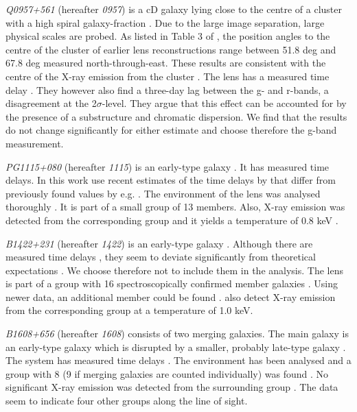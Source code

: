 \documentclass[useAMS,usenatbib]{mn2e}
\begin{document}
\textit{Q0957+561} (hereafter \textit{0957}) is a cD galaxy lying close to the centre of a cluster with a high spiral galaxy-fraction \citep[e.g.][]{1992MNRAS.254P..27G,1994A&A...291..411A,1998ApJ...504..661C}. Due to the large image separation, large physical scales are probed. As listed in Table 3 of \cite{2000ApJ...542...74K}, the position angles to the centre of the cluster of earlier lens reconstructions range between 51.8 deg and 67.8 deg measured north-through-east. These results are consistent with the centre of the X-ray emission from the cluster \citep{1998ApJ...504..661C}. The lens has a measured time delay \citep[e.g.][]{2012A&A...540A.132S}. They however also find a three-day lag between the g- and r-bands, a disagreement at the 2$\sigma$-level. They argue that this effect can be accounted for by the presence of a substructure and chromatic dispersion. We find that the results do not change significantly for either estimate and choose therefore the g-band measurement.

\textit{PG1115+080} (hereafter \textit{1115}) is an early-type galaxy \citep{2005ApJ...626...51Y}. It has measured time delays. In this work use recent estimates of the time delays by \cite{2010MNRAS.406.2764T} that differ from previously found values by e.g. \cite{1997ApJ...489...21B}. The environment of the lens was analysed thoroughly \citep{2006ApJ...641..169M,2011ApJ...726...84W}. It is part of a small group of 13 members. Also, X-ray emission was detected from the corresponding group and it yields a temperature of 0.8 keV \citep{2004ApJ...610..686G}.

\textit{B1422+231} (hereafter \textit{1422}) is an early-type galaxy \citep{1996ApJ...462L..53I}. Although there are measured time delays \citep{2001MNRAS.326.1403P}, they seem to deviate significantly from theoretical expectations \citep{2003AJ....126...29R}. We choose therefore not to include them in the analysis. The lens is part of a group with 16 spectroscopically confirmed member galaxies \citep{2006ApJ...641..169M}. Using newer data, an additional member could be found \citep{2011ApJ...726...84W}. \cite{2004ApJ...610..686G} also detect X-ray emission from the corresponding group at a temperature of 1.0 keV.

\textit{B1608+656} (hereafter \textit{1608}) consists of two merging galaxies. The main galaxy is an early-type galaxy which is disrupted by a smaller, probably late-type galaxy \citep{2003ApJ...584..100S}. The system has measured time delays \citep{2002ApJ...581..823F}. The environment has been analysed and a group with 8 (9 if merging galaxies are counted individually) was found \citep{2006ApJ...642...30F}. No significant X-ray emission was detected from the surrounding group \citep{2005ApJ...625..633D}. The data seem to indicate four other groups along the line of sight.
\end{document}
